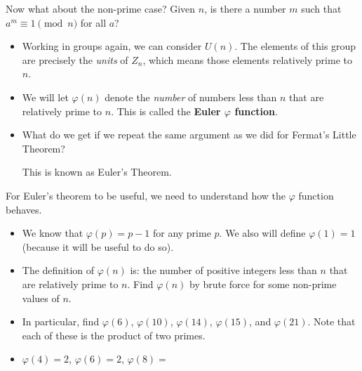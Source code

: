 \documentclass[12pt]{article}
\theoremstyle{plain}
\theoremstyle{definition}
\theoremstyle{remark}
\begin{document}
\clearpage
%
\par
Now what about the non-prime case?  Given \(n\), is there a number \(m\) such that \(a^m \equiv 1 \pmod{n}\) for all \(a\)?%
\begin{itemize}[label=\textbullet]
\vskip 2in
\item{}Working in groups again, we can consider \(U(n)\).  The elements of this group are precisely the \emph{units} of \(Z_n\), which means those elements relatively prime to \(n\).%
\vskip 2in
\item{}We will let \(\varphi(n)\) denote the \emph{number} of numbers less than \(n\) that are relatively prime to \(n\).  This is called the \textbf{Euler \(\varphi\) function}.%
\vskip 2in
\item{} What do we get if we repeat the same argument as we did for Fermat's Little Theorem?
\vskip 2in

This is known as Euler's Theorem.%
\end{itemize}
\clearpage
%
\par
For Euler's theorem to be useful, we need to understand how the \(\varphi\) function behaves.%
\begin{itemize}[label=\textbullet]
\item{}We know that \(\varphi(p) = p-1\) for any prime \(p\).  We also will define \(\varphi(1) = 1\) (because it will be useful to do so).%
\item{}The definition of \(\varphi(n)\) is: the number of positive integers less than \(n\) that are relatively prime to \(n\).  Find \(\varphi(n)\) by brute force for some non-prime values of \(n\).%
\item{}In particular, find \(\varphi(6)\), \(\varphi(10)\), \(\varphi(14)\), \(\varphi(15)\), and \(\varphi(21)\).  Note that each of these is the product of two primes.%
\item{}\(\varphi(4) = 2\), \(\varphi(6) = 2\), \(\varphi(8) = \)%
\end{itemize}
\end{document}
